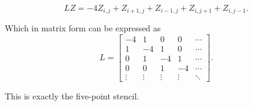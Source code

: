 \documentclass{article}
\begin{document}
\begin{equation}
L Z = -4Z_{i,j} + Z_{i+1,j} + Z_{i-1,j} + Z_{i,j+1} + Z_{i,j-1}.
\end{equation}

Which in matrix form can be expressed as
\begin{equation}
    L = \begin{bmatrix}
        -4 & 1 & 0 & 0 & \cdots \\
        1 & -4 & 1 & 0 & \cdots \\
        0 & 1 & -4 & 1 & \cdots \\
        0 & 0 & 1 & -4 & \cdots \\
        \vdots & \vdots & \vdots & \vdots & \ddots
    \end{bmatrix}.
\end{equation}

This is exactly the five-point stencil.
\end{document}
